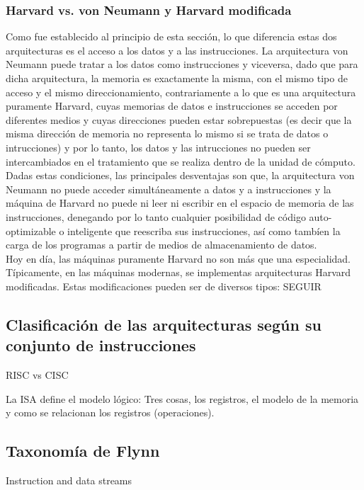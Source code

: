 \subsubsection{Harvard vs. von Neumann y Harvard modificada}

Como fue establecido al principio de esta sección, lo que diferencia estas dos arquitecturas es el acceso a los datos y a las instrucciones. La arquitectura von Neumann puede tratar a los datos como instrucciones y viceversa, dado que para dicha arquitectura, la memoria es exactamente la misma, con el mismo tipo de acceso y el mismo direccionamiento, contrariamente a lo que es una arquitectura puramente Harvard, cuyas memorias de datos e instrucciones se acceden por diferentes medios y cuyas direcciones pueden estar sobrepuestas (es decir que la misma dirección de memoria no representa lo mismo si se trata de datos o intrucciones) y por lo tanto, los datos y las intrucciones no pueden ser intercambiados en el tratamiento que se realiza dentro de la unidad de cómputo. Dadas estas condiciones, las principales desventajas son que, la arquitectura von Neumann no puede acceder simultáneamente a datos y a instrucciones y la máquina de Harvard no puede ni leer ni escribir en el espacio de memoria de las instrucciones, denegando por lo tanto cualquier posibilidad de código auto-optimizable o inteligente que reescriba sus instrucciones, así como tambíen la carga de los programas a partir de medios de almacenamiento de datos.\\
Hoy en día, las máquinas puramente Harvard no son más que una especialidad. Típicamente, en las máquinas modernas, se implementas arquitecturas Harvard modificadas. Estas modificaciones pueden ser de diversos tipos: SEGUIR

\subsection{Clasificación de las arquitecturas según su conjunto de instrucciones}

RISC vs CISC

La ISA define el modelo lógico: Tres cosas, los registros, el modelo de la memoria y como se relacionan los registros (operaciones).

\subsection{Taxonomía de Flynn}

Instruction and data streams



